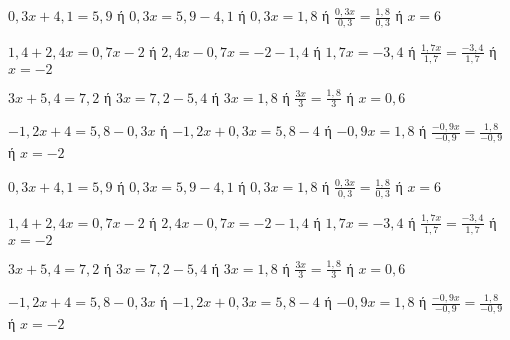 \begin{alist}
\item $ 0{,}3x+4{,}1=5{,}9 $ ή $ 0{,}3x=5{,}9-4{,}1 $ ή $ 0{,}3x=1{,}8 $ ή $ \frac{0{,}3x}{0{,}3}=\frac{1{,}8}{0{,}3} $ ή $ x=6 $
\item $ 1{,}4+2{,}4x=0{,}7x-2 $ ή $ 2{,}4x-0{,}7x=-2-1{,}4 $ ή $ 1{,}7x=-3{,}4 $ ή $ \frac{1{,}7x}{1{,}7}=\frac{-3{,}4}{1{,}7} $ ή $ x=-2 $
\item $ 3x+5{,}4=7{,}2 $ ή $ 3x=7{,}2-5{,}4 $ ή $ 3x=1{,}8 $ ή $ \frac{3x}{3}=\frac{1{,}8}{3} $ ή $ x=0{,}6 $
\item $ -1{,}2x+4=5{,}8-0{,}3x $ ή $ -1{,}2x+0{,}3x=5{,}8-4 $ ή $ -0{,}9x=1{,}8 $ ή $ \frac{-0{,}9x}{-0{,}9}=\frac{1{,}8}{-0{,}9} $ ή $ x=-2 $
\end{alist}
\begin{alist}
\item $ 0{,}3x+4{,}1=5{,}9 $ ή $ 0{,}3x=5{,}9-4{,}1 $ ή $ 0{,}3x=1{,}8 $ ή $ \frac{0{,}3x}{0{,}3}=\frac{1{,}8}{0{,}3} $ ή $ x=6 $
\item $ 1{,}4+2{,}4x=0{,}7x-2 $ ή $ 2{,}4x-0{,}7x=-2-1{,}4 $ ή $ 1{,}7x=-3{,}4 $ ή $ \frac{1{,}7x}{1{,}7}=\frac{-3{,}4}{1{,}7} $ ή $ x=-2 $
\item $ 3x+5{,}4=7{,}2 $ ή $ 3x=7{,}2-5{,}4 $ ή $ 3x=1{,}8 $ ή $ \frac{3x}{3}=\frac{1{,}8}{3} $ ή $ x=0{,}6 $
\item $ -1{,}2x+4=5{,}8-0{,}3x $ ή $ -1{,}2x+0{,}3x=5{,}8-4 $ ή $ -0{,}9x=1{,}8 $ ή $ \frac{-0{,}9x}{-0{,}9}=\frac{1{,}8}{-0{,}9} $ ή $ x=-2 $
\end{alist}
